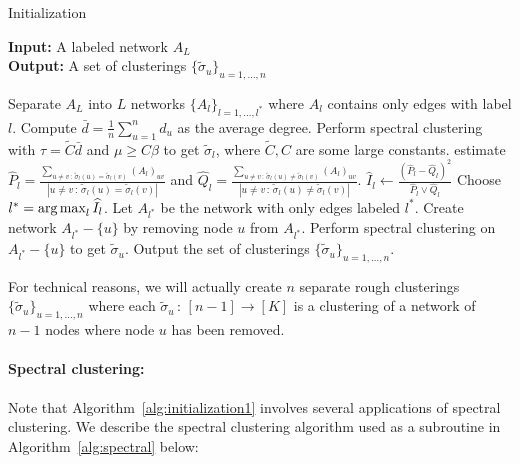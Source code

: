 \begin{algorithm}[h!]
\caption{Initialization}
\label{alg:initialization1}
\textbf{Input:} A labeled network $A_L$ \\
\textbf{Output:} A set of clusterings $\{ \tilde{\sigma}_u \}_{u=1,...,n}$\\

\begin{algorithmic}[1]
\State Separate $A_L$ into $L$ networks $\{ A_l \}_{l=1, \dots, l^*}$ where $A_l$ contains only edges with label $l$.  
   \State Compute $\bar{d} = \frac{1}{n} \sum_{u=1}^n d_u$ as the average degree.
   \State Perform spectral clustering with $\tau = \tilde{C} \bar{d}$ and $\mu \geq C\beta$ to get $\tilde{\sigma}_l$, where $\tilde{C}, C$ are some large constants.
   \State estimate $\hat{P}_l = 
             \frac{ \sum_{u \neq v \,:\, \tilde{\sigma}_l(u) = \tilde{\sigma}_l(v) } (A_l)_{uv} }
                  { |{u \neq v \,:\, \tilde{\sigma}_l(u) = \tilde{\sigma}_l(v) }| }$ and 
               $\hat{Q}_l = 
            \frac{ \sum_{u \neq v \,:\, \tilde{\sigma}_l(u) \neq \tilde{\sigma}_l(v) } (A_l)_{uv} }
              { |{u \neq v \,:\, \tilde{\sigma}_l(u) \neq \tilde{\sigma}_l(v) }| }$. 
   \State $\hat{I}_l \leftarrow 
               \frac{ (\hat{P}_l - \hat{Q}_l)^2}{\hat{P}_l \vee \hat{Q}_l}$
\EndFor
\State Choose $l^* = \mathop{\text{\rm arg\,max}}_l \widehat{I}_l$. Let $A_{l^*}$ be the network with only edges labeled $l^*$.
  
   \State Create network $A_{l^*} - \{u\}$ by removing node $u$ from $A_{l^*}$. 
   \State Perform spectral clustering on $A_{l^*} - \{ u \}$ to get $\tilde{\sigma}_u$.
\EndFor 
\State Output the set of clusterings $\{ \tilde{\sigma}_u \}_{u=1, \dots, n}$.
\end{algorithmic}
\end{algorithm}

For technical reasons, we will actually create $n$ separate rough clusterings $\{\tilde{\sigma}_u \}_{u = 1, \dots, n}$ where each $\tilde{\sigma}_u \,:\, [n-1] \rightarrow [K]$ is a clustering of a network of $n-1$ nodes where node $u$ has been removed.

\paragraph{\textbf{Spectral clustering:}} Note that Algorithm~\ref{alg:initialization1} involves several applications of spectral clustering. We describe the spectral clustering algorithm used as a subroutine in Algorithm~\ref{alg:spectral} below:

